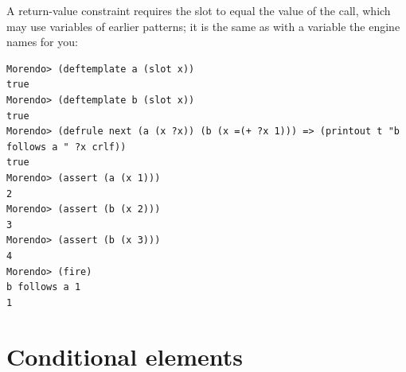 A return-value constraint  requires the slot to equal
the value of the call, which may use variables of earlier patterns; it
is the same as  with a variable the
engine names for you:

\begin{lstlisting}[style=shell]
Morendo> (deftemplate a (slot x))
true
Morendo> (deftemplate b (slot x))
true
Morendo> (defrule next (a (x ?x)) (b (x =(+ ?x 1))) => (printout t "b follows a " ?x crlf))
true
Morendo> (assert (a (x 1)))
2
Morendo> (assert (b (x 2)))
3
Morendo> (assert (b (x 3)))
4
Morendo> (fire)
b follows a 1
1
\end{lstlisting}

\section{Conditional elements}
\label{sec:ces}

